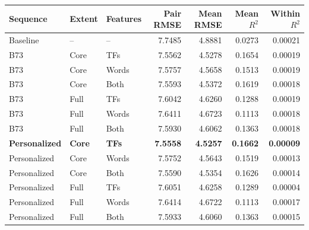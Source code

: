 \begin{tabular}{lllrrrr}
\toprule
Sequence & Extent & Features & Pair RMSE & Mean RMSE & Mean $R^2$ & Within $R^2$\\
\midrule
Baseline & -- & -- & 7.7485 & 4.8881 & 0.0273 & 0.00021\\
B73 & Core & TFs & 7.5562 & 4.5278 & 0.1654 & 0.00019\\
B73 & Core & Words & 7.5757 & 4.5658 & 0.1513 & 0.00019\\
B73 & Core & Both & 7.5593 & 4.5372 & 0.1619 & 0.00018\\
B73 & Full & TFs & 7.6042 & 4.6260 & 0.1288 & 0.00019\\
B73 & Full & Words & 7.6411 & 4.6723 & 0.1113 & 0.00018\\
B73 & Full & Both & 7.5930 & 4.6062 & 0.1363 & 0.00018\\
\textbf{Personalized} & \textbf{Core} & \textbf{TFs} & \textbf{7.5558} & \textbf{4.5257} & \textbf{0.1662} & \textbf{0.00009}\\
Personalized & Core & Words & 7.5752 & 4.5643 & 0.1519 & 0.00013\\
Personalized & Core & Both & 7.5590 & 4.5354 & 0.1626 & 0.00014\\
Personalized & Full & TFs & 7.6051 & 4.6258 & 0.1289 & 0.00004\\
Personalized & Full & Words & 7.6414 & 4.6722 & 0.1113 & 0.00017\\
Personalized & Full & Both & 7.5933 & 4.6060 & 0.1363 & 0.00015\\
\bottomrule
\end{tabular}
